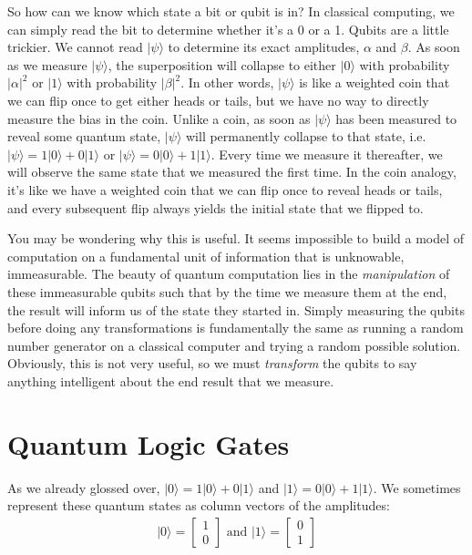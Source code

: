 \documentclass[12pt,twoside]{reedthesis}
\theoremstyle{definition}
\newcommand{\ketz}{\ensuremath{\lvert 0\rangle}\xspace}
\newcommand{\keto}{\ensuremath{\lvert 1\rangle}\xspace}
\newcommand{\ketpsi}{\ensuremath{|\psi\rangle}\xspace}
\begin{document}
So how can we know which state a bit or qubit is in? In classical computing, we can simply read the bit to determine whether it's a 0 or a 1. Qubits are a little trickier. We cannot read \ketpsi to determine its exact amplitudes, $\alpha$ and $\beta$. As soon as we measure \ketpsi, the superposition will collapse to either \ketz with probability $ \lvert \alpha \rvert ^2$ or \keto with probability $ \lvert \beta \rvert ^2$. In other words, \ketpsi is like a weighted coin that we can flip once to get either heads or tails, but we have no way to directly measure the bias in the coin. Unlike a coin, as soon as \ketpsi has been measured to reveal some quantum state, \ketpsi will permanently collapse to that state, i.e.~$\ketpsi = 1\ketz + 0 \keto$ or $\ketpsi = 0\ketz + 1\keto$. Every time we measure it thereafter, we will observe the same state that we measured the first time. In the coin analogy, it's like we have a weighted coin that we can flip once to reveal heads or tails, and every subsequent flip always yields the initial state that we flipped to.

You may be wondering why this is useful. It seems impossible to build a model of computation on a fundamental unit of information that is unknowable, immeasurable. The beauty of quantum computation lies in the \textit{manipulation} of these immeasurable qubits such that by the time we measure them at the end, the result will inform us of the state they started in. Simply measuring the qubits before doing any transformations is fundamentally the same as  running a random number generator on a classical computer and trying a random possible solution. Obviously, this is not very useful, so we must \textit{transform} the qubits to say anything intelligent about the end result that we measure.

\section{Quantum Logic Gates}

As we already glossed over, $\ketz = 1 \ketz + 0  \keto$ and $\keto = 0 \ketz + 1 \keto$. We sometimes represent these quantum states as column vectors of the amplitudes: 
\begin{align*}
\ketz = \begin{bmatrix}
1\\
0
\end{bmatrix}
\text{ and }
\keto = \begin{bmatrix}
0\\
1
\end{bmatrix}
\end{align*}
\end{document}
